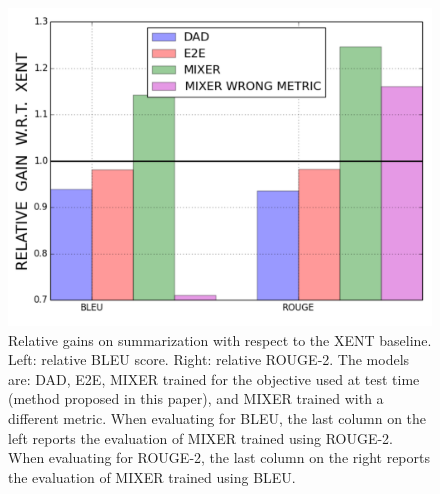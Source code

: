 \begin{figure}[!h]
\begin{center}
 \includegraphics[width=0.6\linewidth]{summarization_bleu_rouge.pdf}
 \end{center}
\caption{Relative gains on summarization with respect to the XENT baseline. Left: relative BLEU score. Right: relative ROUGE-2.
The models are: DAD, E2E, MIXER trained for the objective used at test time (method proposed in this paper), and MIXER trained with a different metric.
When evaluating for BLEU, the last column on the left reports the evaluation of MIXER trained using ROUGE-2.
When evaluating for ROUGE-2, the last column on the right reports the evaluation of MIXER trained using BLEU.}
\label{fig:summarization_bleu_rouge}
\end{figure}



\vspace{0.3in}



